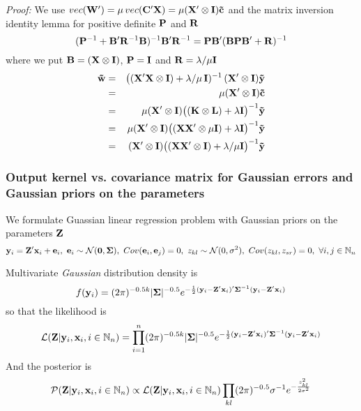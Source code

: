 \begin{small}
\emph{Proof:} We use $vec(\mathbf{W'}) = \mu \, vec(\mathbf{C'X}) = \mu (\mathbf{X}' \otimes \mathbf{I}) \mathbf{\tilde{c}}$ and the
matrix inversion identity lemma for positive definite $\mathbf{P}$ and $\mathbf{R}$
\begin{equation}
 (\mathbf{P}^{-1} + \mathbf{B}' \mathbf{R}^{-1} \mathbf{B} )^{-1} \mathbf{B}' \mathbf{R}^{-1} =
\mathbf{P} \mathbf{B}' (\mathbf{B} \mathbf{P} \mathbf{B}' + \mathbf{R})^{-1}
\end{equation}
where we put $\mathbf{B} =
(\mathbf{X} \otimes \mathbf{I})$, $\mathbf{P} = \mathbf{I}$ and $\mathbf{R} = \lambda/\mu \mathbf{I}$
\begin{eqnarray*}
\mathbf{\tilde{w}} & = & \big( (\mathbf{X'X} \otimes \mathbf{I}) + \lambda/\mu \, \mathbf{I})^{-1} \, (\mathbf{X'} \otimes \mathbf{I}) \mathbf{\tilde{y}}\\
& = &  \mu (\mathbf{X}' \otimes \mathbf{I}) \mathbf{\tilde{c}} \\
& = &  \mu (\mathbf{X}' \otimes \mathbf{I}) \big( (\mathbf{K} \otimes \mathbf{L}) + \lambda \mathbf{I} \big)^{-1} \mathbf{\tilde{y}}\\
& = &  \mu (\mathbf{X}' \otimes \mathbf{I}) \big( (\mathbf{XX'} \otimes \mu \mathbf{I}) + \lambda \mathbf{I} \big)^{-1} \mathbf{\tilde{y}}\\
& = &  (\mathbf{X}' \otimes \mathbf{I}) \big( (\mathbf{XX'} \otimes \mathbf{I}) + \lambda/\mu \mathbf{I} \big)^{-1} \mathbf{\tilde{y}}\\
\end{eqnarray*}
\end{small}

\subsubsection{Output kernel vs. covariance matrix for Gaussian errors and Gaussian priors on the parameters}
We formulate Guassian linear regression problem with Gaussian priors on the parameters $\mathbf{Z}$
\begin{equation}
\vc{y}_i = \vc{Z}' \vc{x}_i + \vc{e}_i, \ \vc{e}_i \sim \mathcal{N}(\vc{0},\vc{\Sigma}), \ Cov(\vc{e}_i,\vc{e}_j) =0, \ z_{kl} \sim \mathcal{N}(0,\sigma^2), \ Cov(z_{kl},z_{sr})=0, \  \forall i,j \in \mathbb{N}_n
\end{equation}

Multivariate \emph{Gaussian} distribution density is
\begin{equation}
f(\mathbf{y}_i) = (2\pi)^{-0.5k} |\mathbf{\Sigma}|^{-0.5} e^{-\frac{1}{2} (\mathbf{y}_i - \mathbf{Z}'\mathbf{x}_i)' \mathbf{\Sigma}^{-1} (\mathbf{y}_i - \mathbf{Z}'\mathbf{x}_i)}
\end{equation}
so that the likelihood is
\begin{equation}
\mathcal{L}(\mathbf{Z}|\mathbf{y}_i,\mathbf{x}_i, i \in \mathbb{N}_n) = \prod_{i=1}^n (2\pi)^{-0.5k} |\mathbf{\Sigma}|^{-0.5} e^{-\frac{1}{2} (\mathbf{y}_i - \mathbf{Z}' \mathbf{x}_i)' \mathbf{\Sigma}^{-1} (\mathbf{y}_i - \mathbf{Z}' \mathbf{x}_i)}
\end{equation}
And the posterior is
\begin{equation}
\mathcal{P}(\mathbf{Z}|\mathbf{y}_i,\mathbf{x}_i, i \in \mathbb{N}_n) \propto \mathcal{L}(\mathbf{Z}|\mathbf{y}_i,\mathbf{x}_i, i \in \mathbb{N}_n)
\prod_{kl} (2\pi)^{-0.5} \sigma^{-1} e^{-\frac{z_{kl}^2}{2\sigma^2} } 
\end{equation}

